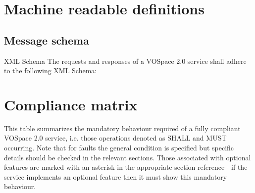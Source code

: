 \documentclass[11pt,a4paper]{ivoa}
\begin{document}
\begin{appendices}

\section{Machine readable definitions}
\label{sec:machine readable definitions}
\subsection{Message schema}
\label{subsec:message schema}
XML Schema
The requests and responses of a VOSpace 2.0 service shall adhere to the following XML Schema:



\section{Compliance matrix}
\label{sec:compliance matrix}
This table summarizes the mandatory behaviour required of a fully compliant VOSpace 2.0 service, i.e. those operations denoted as SHALL and MUST occurring. Note that for faults the general condition is specified but specific details should be checked in the relevant sections. Those associated with optional features are marked with an asterisk in the appropriate section reference - if the service implements an optional feature then it must show this mandatory behaviour.


\end{appendices}
\end{document}
